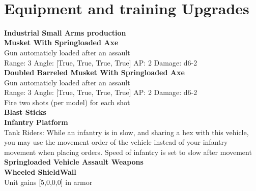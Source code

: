  
\ \\


\section{Equipment and training Upgrades}{\bf Industrial Small Arms production } \\






{\bf Musket With Springloaded Axe } \\

Gun automaticly loaded after an assault\\ 


Range: 3  Angle: [True, True, True, True] AP: 2 Damage: d6-2 \\




{\bf Doubled Barreled Musket With Springloaded Axe } \\

Gun automaticly loaded after an assault\\ 


Range: 3  Angle: [True, True, True, True] AP: 2 Damage: d6-2 \\
Fire two shots (per model) for each shot\\ 




{\bf Blast Sticks } \\






{\bf Infantry Platform } \\

Tank Riders: While an infantry is in slow, and sharing a hex with this vehicle, you may use the movement order of the vehicle instead of your infantry movement when placing orders. Speed of infantry is set to slow after movement\\ 





{\bf Springloaded Vehicle Assault Weapons } \\






{\bf Wheeled ShieldWall } \\

Unit gains [5,0,0,0] in armor\\ 





